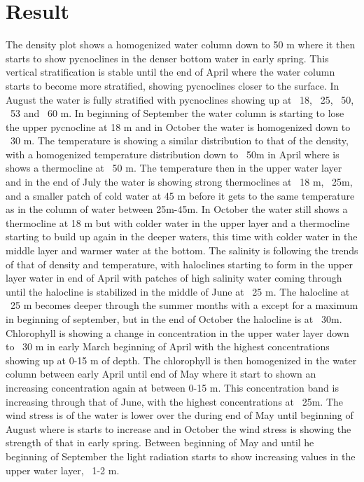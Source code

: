 \documentclass[../Main.tex]{subfiles}
\begin{document}
\section{Result}
The density plot shows a homogenized water column down to 50 m where it then starts to show pycnoclines in the denser bottom water in early spring. This vertical stratification is stable until the end of April where the water column starts to become more stratified, showing pycnoclines closer to the surface. In August the water is fully stratified with pycnoclines showing up at ~18, ~25, ~50, ~53 and ~60 m. In beginning of September the water column is starting to lose the upper pycnocline at 18 m and in October the water is homogenized down to ~30 m. The temperature is showing a similar distribution to that of the density, with a homogenized temperature distribution down to ~50m in April where is shows a thermocline at ~50 m. The temperature then in the upper water layer and in the end of July the water is showing strong thermoclines at ~18 m, ~25m, and a smaller patch of cold water at 45 m before it gets to the same temperature as in the column of water between 25m-45m. In October the water still shows a thermocline at 18 m but with colder water in the upper layer and a thermocline starting to build up again in the deeper waters, this time with colder water in the middle layer and warmer water at the bottom. The salinity is following the trends of that of density and temperature, with haloclines starting to form in the upper layer water in end of April with patches of high salinity water coming through until the halocline is stabilized in the middle of June at ~25 m. The halocline at ~25 m becomes deeper through the summer months with a except for a maximum in beginning of september, but in the end of October the halocline is at ~30m. Chlorophyll is showing a change in concentration in the upper water layer down to ~30 m in early March beginning of April with the highest concentrations showing up at 0-15 m of depth. The chlorophyll is then homogenized in the water column between early April until end of May where it start to shown an increasing concentration again at between 0-15 m. This concentration band is increasing through that of June, with the highest concentrations at ~25m. The wind stress is of the water is lower over the during end of May until beginning of August where is starts to increase and in October the wind stress is showing the strength of that in early spring. Between beginning of May and until he beginning of September the light radiation starts to show increasing values in the upper water layer, ~1-2 m. 
\end{document}
